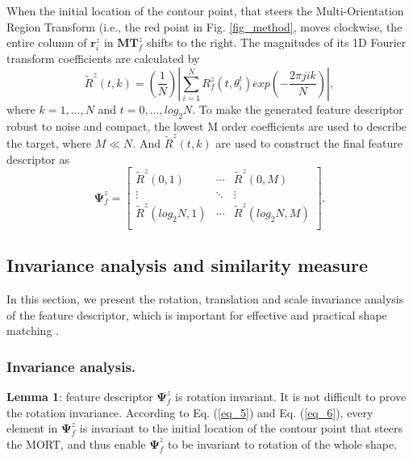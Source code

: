 \documentclass[letterpaper]{article} %
\begin{document}
When the initial location of the contour point, that steers the Multi-Orientation Region Transform (i.e., the red point in Fig. \ref{fig_method}, moves clockwise, the entire column of $\boldsymbol{r}_i^z$ in $\boldsymbol{MT}_f^z$  shifts to the right. The magnitudes of its 1D Fourier transform coefficients are calculated by
\begin{equation}
 \widetilde{R}^z (t,k)= (\frac{1}{N}) \left|\sum_{i=1}^N R_f^z (t,\theta_i^t) exp{(-\frac{2\pi jik}{N})}\right|,
 \label{eq_5}
\end{equation}
where $k=1,\dots,N$ and $t=0,\dots,log_2 N$. To make the generated feature descriptor robust to noise and compact, the lowest M order coefficients are used to describe the target, where $M\ll N$. And $\widetilde{R}^z (t,k)$ are used to construct the final feature descriptor as
\begin{equation}
\boldsymbol{\Psi}_f^z = \left[
\begin{matrix}
\widetilde{R}^z (0,1)    & \cdots & \widetilde{R}^z (0,M)      \\
 \vdots  & \ddots & \vdots \\
 \widetilde{R}^z (log_2 N,1)     & \cdots & \widetilde{R}^z (log_2 N,M)    \\
\end{matrix}
\right]. 
\label{eq_6}
\end{equation}



\subsection{Invariance analysis and similarity measure}

In this section, we present the rotation, translation and scale invariance analysis of the feature descriptor, which is important for effective and practical shape matching \cite{6}. 

\subsubsection{Invariance analysis.}

\textbf{Lemma 1}: feature descriptor $\boldsymbol{\Psi}_f^z$ is rotation invariant. It is not difficult to prove the rotation invariance. According to Eq. (\ref{eq_5}) and Eq. (\ref{eq_6}), every element in $\boldsymbol{\Psi}_f^z$ is invariant to the initial location of the contour point that steers the MORT, and thus enable $\boldsymbol{\Psi}_f^z$ to be invariant to rotation of the whole shape. 
\end{document}
